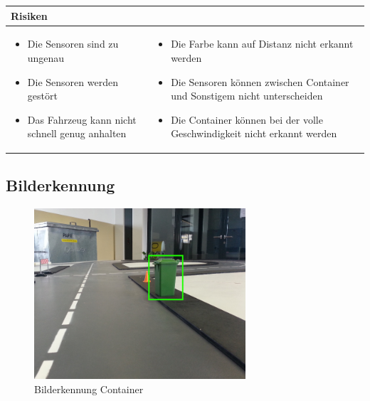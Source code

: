 \begin{table}[h]
\begin{tabular}{p{}p{}}


 \textbf{Risiken} & \\ \hline
	 
\begin{itemize}
\item Die Sensoren sind zu ungenau
\item Die Sensoren werden gestört
\item Das Fahrzeug kann nicht schnell genug anhalten
\end{itemize}
&
\begin{itemize}
\item Die Farbe kann auf Distanz nicht erkannt werden
\item Die Sensoren können zwischen Container und Sonstigem nicht unterscheiden
\item Die Container können bei der volle Geschwindigkeit nicht erkannt werden
\end{itemize}

 
\end{tabular}
\end{table}

\pagebreak


\subsection{Bilderkennung}
\begin{figure}[h!]%
\centering
\includegraphics[width=0.7\textwidth]{fig/containererkennung_grob_bilderkennung.png}
\caption{Bilderkennung Container}
\label{fig:Bilderkennung Container}
\end{figure}

